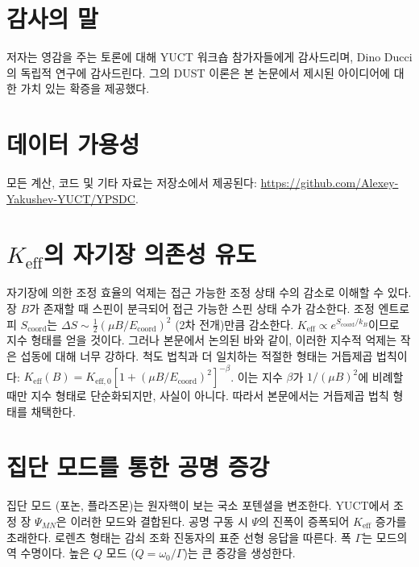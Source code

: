 \documentclass[11pt,a4paper]{article}
\theoremstyle{remark}
\newcommand{\Keff}{K_{\mathrm{eff}}}
\newcommand{\Keffzero}{K_{\mathrm{eff},0}}
\begin{document}
	\section*{감사의 말}
	저자는 영감을 주는 토론에 대해 YUCT 워크숍 참가자들에게 감사드리며, Dino Ducci의 독립적 연구에 감사드린다. 그의 DUST 이론은 본 논문에서 제시된 아이디어에 대한 가치 있는 확증을 제공했다.
	
	\section*{데이터 가용성}
	모든 계산, 코드 및 기타 자료는 저장소에서 제공된다: \url{https://github.com/Alexey-Yakushev-YUCT/YPSDC}.
	
	\appendix
	\section{\(\Keff\)의 자기장 의존성 유도}
	\label{app:B}
	
	자기장에 의한 조정 효율의 억제는 접근 가능한 조정 상태 수의 감소로 이해할 수 있다. 장 \(B\)가 존재할 때 스핀이 분극되어 접근 가능한 스핀 상태 수가 감소한다. 조정 엔트로피 \(S_{\text{coord}}\)는 \(\Delta S \sim \frac{1}{2} (\mu B / E_{\mathrm{coord}})^2\) (2차 전개)만큼 감소한다. \(\Keff \propto e^{S_{\text{coord}}/k_B}\)이므로 지수 형태를 얻을 것이다. 그러나 본문에서 논의된 바와 같이, 이러한 지수적 억제는 작은 섭동에 대해 너무 강하다. 척도 법칙과 더 일치하는 적절한 형태는 거듭제곱 법칙이다: \(\Keff(B) = \Keffzero [1 + (\mu B/E_{\mathrm{coord}})^2]^{-\beta}\). 이는 지수 \(\beta\)가 \(1/(\mu B)^2\)에 비례할 때만 지수 형태로 단순화되지만, 사실이 아니다. 따라서 본문에서는 거듭제곱 법칙 형태를 채택한다.
	
	\section{집단 모드를 통한 공명 증강}
	\label{app:resonance}
	
	집단 모드 (포논, 플라즈몬)는 원자핵이 보는 국소 포텐셜을 변조한다. YUCT에서 조정 장 \(\Psi_{MN}\)은 이러한 모드와 결합된다. 공명 구동 시 \(\Psi\)의 진폭이 증폭되어 \(\Keff\) 증가를 초래한다. 로렌츠 형태는 감쇠 조화 진동자의 표준 선형 응답을 따른다. 폭 \(\Gamma\)는 모드의 역 수명이다. 높은 \(Q\) 모드 (\(Q = \omega_0/\Gamma\))는 큰 증강을 생성한다.
	
\end{document}
